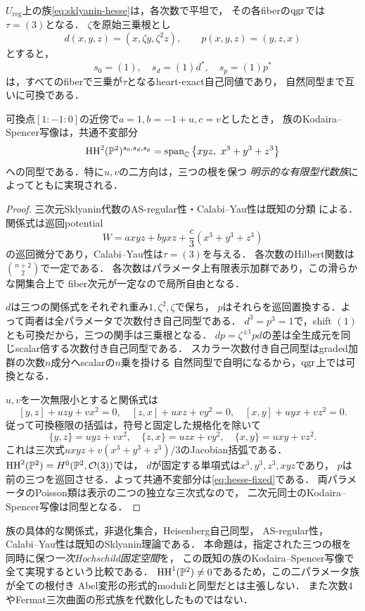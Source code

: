 \begin{proposition}[Hesse型の二方向を同時代数化する族]\label{prop:hesse-two-param}
$U_{\mathrm{reg}}$上の族\eqref{eq:sklyanin-hesse}は，各次数で平坦で，
その各fiberの$\operatorname{qgr}$では$\tau=(3)$となる．
$\zeta$を原始三乗根とし
\[
 d(x,y,z)=(x,\zeta y,\zeta^2z),\qquad p(x,y,z)=(y,z,x)
\]
とすると，
\[
 s_0=(1),\quad s_d=(1)d^*,\quad s_p=(1)p^*
\]
は，すべてのfiberで三乗が$\tau$となるheart-exact自己同値であり，
自然同型まで互いに可換である．

可換点$[1:-1:0]$の近傍で$a=1,b=-1+u,c=v$としたとき，
族のKodaira--Spencer写像は，共通不変部分
\begin{equation}\label{eq:hesse-fixed}
 \operatorname{HH}^2(\mathbb P^2)^{s_0,s_d,s_p}
 =\operatorname{span}_{\mathbb C}\left\{xyz,\ x^3+y^3+z^3\right\}
\end{equation}
への同型である．特に$u,v$の二方向は，三つの根を保つ
\emph{明示的な有限型代数族}によってともに実現される．
\end{proposition}
\begin{proof}
三次元Sklyanin代数のAS-regular性・Calabi--Yau性は既知の分類
\cite{ATVSk,MoriSmith}による．関係式は巡回potential
\[
 W=axyz+byxz+\frac c3(x^3+y^3+z^3)
\]
の巡回微分であり，Calabi--Yau性は$\tau=(3)$を与える．
各次数のHilbert関数は$\binom{n+2}{2}$で一定である．
各次数はパラメータ上有限表示加群であり，この滑らかな開集合上で
fiber次元が一定なので局所自由となる．

$d$は三つの関係式をそれぞれ重み$1,\zeta^2,\zeta$で保ち，
$p$はそれらを巡回置換する．よって両者は全パラメータで次数付き自己同型である．
$d^3=p^3=1$で，shift $(1)$とも可換だから，三つの関手は三乗根となる．
$d p=\zeta^{\pm1}p d$の差は全生成元を同じscalar倍する次数付き自己同型である．
スカラー次数付き自己同型はgraded加群の次数$n$成分へscalarの$n$乗を掛ける
自然同型で自明になるから，$\operatorname{qgr}$上では可換となる．

$u,v$を一次無限小とすると関係式は
\[
 [y,z]+uzy+vx^2=0,\quad[z,x]+uxz+vy^2=0,\quad
 [x,y]+uyx+vz^2=0.
\]
従って可換極限の括弧は，符号と固定した規格化を除いて
\[
 \{y,z\}=u yz+vx^2,\quad
 \{z,x\}=u zx+vy^2,\quad
 \{x,y\}=u xy+vz^2.
\]
これは三次式$u xyz+v(x^3+y^3+z^3)/3$のJacobian括弧である．
$\operatorname{HH}^2(\mathbb P^2)=H^0(\mathbb P^2,\mathcal O(3))$では，
$d$が固定する単項式は$x^3,y^3,z^3,xyz$であり，
$p$は前の三つを巡回させる．よって共通不変部分は\eqref{eq:hesse-fixed}である．
両パラメータのPoisson類は表示の二つの独立な三次式なので，
二次元同士のKodaira--Spencer写像は同型となる．
\end{proof}

\begin{remark}[代数化の範囲と既知理論]
族の具体的な関係式，非退化集合，Heisenberg自己同型，
AS-regular性，Calabi--Yau性は既知のSklyanin理論である．
本命題は，指定された三つの根を同時に保つ\emph{一次Hochschild固定空間}を，
この既知の族のKodaira--Spencer写像で全て実現するという比較である．
$\operatorname{HH}^1(\mathbb P^2)\ne0$であるため，この二パラメータ族が全ての根付き
Abel変形の形式的moduliと同型だとは主張しない．
また次数4やFermat三次曲面の形式族を代数化したものではない．
\end{remark}
